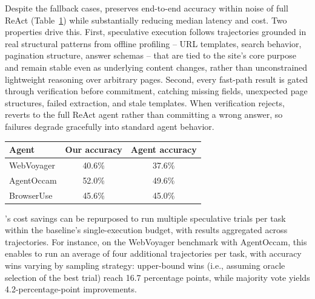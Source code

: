 Despite the fallback cases, \sys preserves end-to-end accuracy within noise of full ReAct (Table~\ref{t:accuracy-comparison}) while substantially reducing median latency and cost. Two properties drive this. First, speculative execution follows trajectories grounded in real structural patterns from offline profiling -- URL templates, search behavior, pagination structure, answer schemas -- that are tied to the site's core purpose and remain stable even as underlying content changes, rather than unconstrained lightweight reasoning over arbitrary pages. Second, every fast-path result is gated through verification before commitment, catching missing fields, unexpected page structures, failed extraction, and stale templates. When verification rejects, \sys reverts to the full ReAct agent rather than committing a wrong answer, so failures degrade gracefully into standard agent behavior.
\begin{table}[t]
    \centering
    \small
    \begin{tabular}{lcc}
        \toprule
        \textbf{Agent} & \textbf{Our accuracy} & \textbf{Agent accuracy} \\
        \midrule
        WebVoyager & 40.6\% & 37.6\% \\
        AgentOccam & 52.0\% & 49.6\% \\
        BrowserUse & 45.6\% & 45.0\% \\
        \bottomrule
    \end{tabular}
    \vspace{8pt}
        \label{t:accuracy-comparison}
\end{table}

 \sys{}'s cost savings can be repurposed to run multiple speculative trials per task within the baseline's single-execution budget, with results aggregated across trajectories. For instance, on the WebVoyager benchmark with AgentOccam, this enables \sys to run an average of four additional trajectories per task, with accuracy wins varying by sampling strategy: upper-bound wins (i.e., assuming oracle selection of the best trial) reach 16.7 percentage points, while majority vote yields 4.2-percentage-point improvements. 





